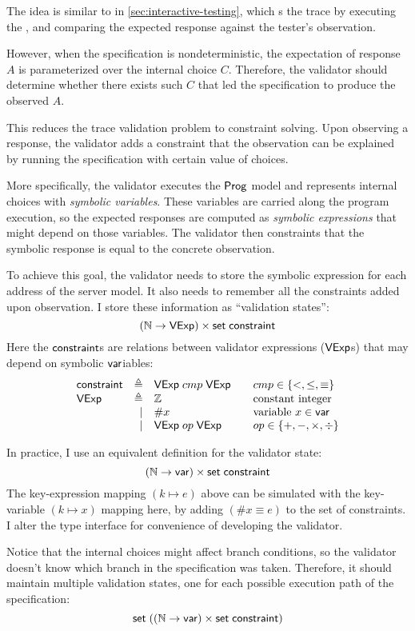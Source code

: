 The idea is similar to  in \autoref{sec:interactive-testing}, which
s the trace by executing the , and comparing the
expected response against the tester's observation.

However, when the specification is nondeterministic, the expectation of response
$A$ is parameterized over the internal choice $C$.  Therefore, the validator
should determine whether there exists such $C$ that led the specification to
produce the observed $A$.

This reduces the trace validation problem to constraint solving.  Upon observing
a response, the validator adds a constraint that the observation can be
explained by running the specification with certain value of choices.

More specifically, the validator executes the $\mathsf{Prog}$ model and represents
internal choices with {\em symbolic variables}.  These variables are carried
along the program execution, so the expected responses are computed as {\em
  symbolic expressions} that might depend on those variables.  The validator
then constraints that the symbolic response is equal to the concrete
observation.

To achieve this goal, the validator needs to store the symbolic expression for
each address of the server model.  It also needs to remember all the constraints
added upon observation.  I store these information as ``validation states'':
\[(\mathbb N\to\mathsf{VExp})\times\mathsf{set}\;\mathsf{constraint}\]
Here the $\mathsf{constraint}$s are relations between validator expressions ($\mathsf{VExp}$s)
that may depend on symbolic $\mathsf{var}$iables:
\[\begin{array}{lrl@{\qquad}l}
\constraint&\triangleq&\Vexp\ccmp\Vexp&cmp\in\{<,\le,\equiv\}\\
\Vexp&\triangleq&\Int&\text{constant integer}\\
&\mid&\#x&\text{variable }x\in\Var\\
&\mid&\Vexp\oop\Vexp&op\in\{+,-,\times,\div\}\\
\end{array}\]

In practice, I use an equivalent definition for the validator state:
\[(\mathbb N\to\mathsf{var})\times\mathsf{set}\;\mathsf{constraint}\]
The key-expression mapping $(k\mapsto e)$ above can be simulated with the
key-variable $(k\mapsto x)$ mapping here, by adding $(\#x\equiv e)$ to the set
of constraints.  I alter the type interface for convenience of developing the
validator.

Notice that the internal choices might affect branch conditions, so the
validator doesn't know which branch in the specification was taken.  Therefore,
it should maintain multiple validation states, one for each possible execution
path of the specification:
\[\mathsf{set}\;((\mathbb N\to\mathsf{var})\times\mathsf{set}\;\mathsf{constraint})\]

